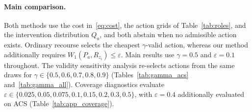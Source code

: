 \paragraph{Main comparison.}
Both methods use the cost in~\eqref{eq:cost}, the action grids of
Table~\ref{tab:roles}, and the intervention distribution $Q_a$, and both
abstain when no admissible action exists. Ordinary recourse selects the
cheapest $\gamma$-valid action, whereas our method additionally requires
$W_1(P_a,R_{z_i})\le\varepsilon$. Main results use $\gamma=0.5$ and
$\varepsilon=0.1$ throughout. The validity sensitivity analysis re-selects
actions from the same draws for $\gamma\in\{0.5,0.6,0.7,0.8,0.9\}$
(Tables~\ref{tab:gamma_acs} and~\ref{tab:gamma_all}). Coverage diagnostics
evaluate $\varepsilon\in\{0.025,0.05,0.075,0.1,0.15,0.2,0.3,0.5\}$, with
$\varepsilon=0.4$ additionally evaluated on ACS
(Table~\ref{tab:app_coverage}).

